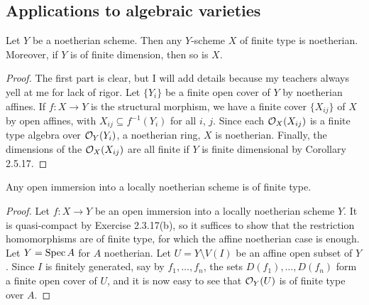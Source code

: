 \subsection{Applications to algebraic varieties}

\begin{exer}
	Let $Y$ be a noetherian scheme. Then any $Y$-scheme $X$ of finite type
	is noetherian. Moreover, if $Y$ is of finite dimension, then so is $X$.
\end{exer}
\begin{proof}
	The first part is clear, but I will add details because my teachers
	always yell at me for lack of rigor. Let $\{Y_i\}$ be a finite open
	cover of $Y$ by noetherian affines. If $f: X \to Y$ is the structural
	morphism, we have a finite cover $\{X_{ij}\}$ of $X$ by open affines,
	with $X_{ij} \subseteq f^{-1}(Y_i)$ for all $i$, $j$. Since each
	$\mathcal{O}_X(X_{ij})$ is a finite type algebra over $\mathcal{O}_Y(Y_i)$, a noetherian
	ring, $X$ is noetherian. Finally, the dimensions of the $\mathcal{O}_X(X_{ij})$
	are all finite if $Y$ is finite dimensional by Corollary 2.5.17.
\end{proof}

\begin{exer}
	Any open immersion into a locally noetherian scheme is of finite type.
\end{exer}
\begin{proof}
	Let $f: X \to Y$ be an open immersion into a locally noetherian scheme
	$Y$. It is quasi-compact by Exercise 2.3.17(b), so it suffices to show
	that the restriction homomorphisms are of finite type, for which the
	affine noetherian case is enough. Let $Y = \operatorname{Spec} A$ for $A$ noetherian.
	Let $U = Y \setminus V(I)$ be an affine open subset of $Y$. Since $I$ is
	finitely generated, say by $f_1, \ldots, f_n$, the sets $D(f_1), \ldots,
	D(f_n)$ form a finite open cover of $U$, and it is now easy to see that
	$\mathcal{O}_Y(U)$ is of finite type over $A$.
\end{proof}

